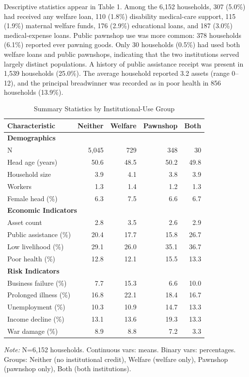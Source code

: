 \documentclass[12pt,a4paper]{article}
\begin{document}
Descriptive statistics appear in Table 1. Among the 6,152 households, 307 (5.0\%) had received any welfare loan, 110 (1.8\%) disability medical-care support, 115 (1.9\%) maternal welfare funds, 176 (2.9\%) educational loans, and 187 (3.0\%) medical-expense loans. Public pawnshop use was more common: 378 households (6.1\%) reported ever pawning goods. Only 30 households (0.5\%) had used both welfare loans and public pawnshops, indicating that the two institutions served largely distinct populations. A history of public assistance receipt was present in 1,539 households (25.0\%). The average household reported 3.2 assets (range 0--12), and the principal breadwinner was recorded as in poor health in 856 households (13.9\%).

\begin{table}[!h]
\centering
\small
\caption{Summary Statistics by Institutional-Use Group}
\label{tab:summary}
\begin{tabular}{lrrrr}
\toprule
Characteristic & Neither & Welfare & Pawnshop & Both \\
\midrule
\multicolumn{5}{l}{\textbf{Demographics}} \\
N & 5,045 & 729 & 348 & 30 \\
Head age (years) & 50.6 & 48.5 & 50.2 & 49.8 \\
Household size & 3.9 & 4.1 & 3.8 & 3.9 \\
Workers & 1.3 & 1.4 & 1.2 & 1.3 \\
Female head (\%) & 6.3 & 7.5 & 6.6 & 6.7 \\
\midrule
\multicolumn{5}{l}{\textbf{Economic Indicators}} \\
Asset count & 2.8 & 3.5 & 2.6 & 2.9 \\
Public assistance (\%) & 20.4 & 17.7 & 15.8 & 26.7 \\
Low livelihood (\%) & 29.1 & 26.0 & 35.1 & 36.7 \\
Poor health (\%) & 12.8 & 12.1 & 15.5 & 13.3 \\
\midrule
\multicolumn{5}{l}{\textbf{Risk Indicators}} \\
Business failure (\%) & 7.7 & 15.3 & 6.6 & 10.0 \\
Prolonged illness (\%) & 16.8 & 22.1 & 18.4 & 16.7 \\
Unemployment (\%) & 10.3 & 10.9 & 14.7 & 13.3 \\
Income decline (\%) & 13.1 & 13.6 & 19.3 & 13.3 \\
War damage (\%) & 8.9 & 8.8 & 7.2 & 3.3 \\
\bottomrule
\end{tabular}

\noindent\small\emph{Note:} N=6,152 households. Continuous vars: means. Binary vars: percentages. Groups: Neither (no institutional credit), Welfare (welfare only), Pawnshop (pawnshop only), Both (both institutions).
\end{table}
\end{document}

